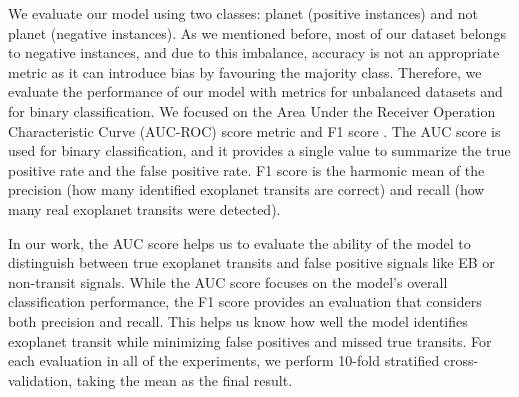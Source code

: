 We evaluate our model using two classes: planet (positive instances) and not planet (negative instances). As we mentioned before, most of our dataset belongs to negative instances, and due to this imbalance, accuracy is not an appropriate metric as it can introduce bias by favouring the majority class. Therefore, we evaluate the performance of our model with metrics for unbalanced datasets and for binary classification. We focused on the Area Under the Receiver Operation Characteristic Curve (AUC-ROC) score metric and F1 score \citep{powers2020evaluation}. The AUC score is used for binary classification, and it provides a single value to summarize the true positive rate and the false positive rate. F1 score is the harmonic mean of the precision (how many identified exoplanet transits are correct) and recall (how many real exoplanet transits were detected).  \par

In our work, the AUC score helps us to evaluate the ability of the model to distinguish between true exoplanet transits and false positive signals like EB or non-transit signals. While the AUC score focuses on the model's overall classification performance, the F1 score provides an evaluation that considers both precision and recall. This helps us know how well the model identifies exoplanet transit while minimizing false positives and missed true transits. For each evaluation in all of the experiments, we perform 10-fold stratified cross-validation, taking the mean as the final result. \par



